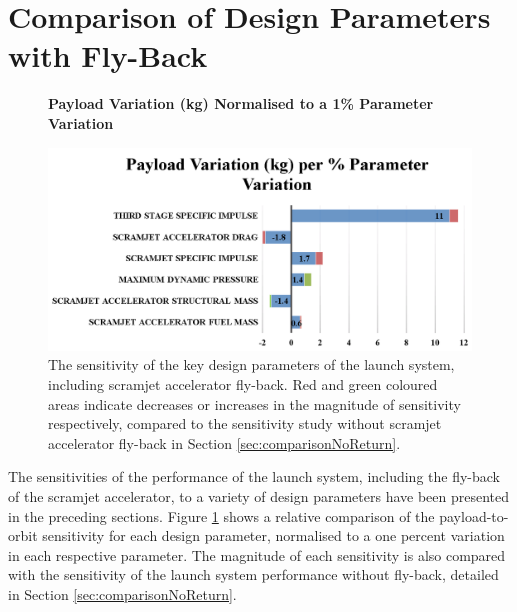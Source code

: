 \section{Comparison of Design Parameters with Fly-Back}\label{sec:thermal}%
\begin{figure}[th]
	\centering
	\textbf{Payload Variation (kg) Normalised to a 1\% Parameter Variation}\par\medskip
	\includegraphics[width=0.99\linewidth]{figures/6_FlyBack/BarChart}
	\caption{The sensitivity of the key design parameters of the launch system, including scramjet accelerator fly-back. Red and green coloured areas indicate decreases or increases in the magnitude of sensitivity respectively, compared to the sensitivity study without scramjet accelerator fly-back in Section \ref{sec:comparisonNoReturn}.}
	\label{fig:BarChartreturn}
\end{figure}
\noindent
The sensitivities of the performance of the launch system, including the fly-back of the scramjet accelerator, to a variety of design parameters have been presented in the preceding sections. Figure \ref{fig:BarChartreturn} shows a relative comparison of the payload-to-orbit sensitivity for each design parameter, normalised to a one percent variation in each respective parameter. The magnitude of each sensitivity is also compared with the sensitivity of the launch system performance without fly-back, detailed in Section \ref{sec:comparisonNoReturn}.

